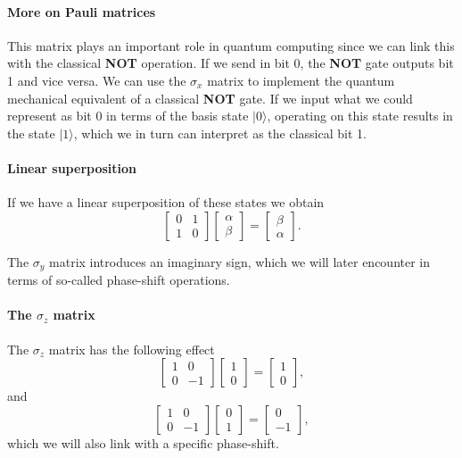 \paragraph{More on Pauli matrices}

This matrix plays an important role in quantum computing since we can
link this with the classical \textbf{NOT} operation.  If we send in bit 0,
the \textbf{NOT} gate outputs bit 1 and vice versa. We can use the $\sigma_x$
matrix to implement the quantum mechanical equivalent of a classical
\textbf{NOT} gate. If we input what we could represent as bit 0 in terms of
the basis state $\vert 0\rangle$, operating on this state results in
the state $\vert 1\rangle$, which we in turn can interpret as the
classical bit 1.


\paragraph{Linear superposition}
If we have a linear superposition of these states we obtain
\[
\begin{bmatrix}0 & 1 \\ 1 & 0 \end{bmatrix}\begin{bmatrix}\alpha \\ \beta \end{bmatrix}=\begin{bmatrix}\beta \\ \alpha \end{bmatrix}.
\]

The $\sigma_y$ matrix introduces an imaginary sign, which we will later encounter in terms of so-called phase-shift operations.


\paragraph{The $\sigma_z$ matrix}
The $\sigma_z$ matrix has the following effect
\[
\begin{bmatrix} 1 & 0 \\ 0 & -1 \end{bmatrix}\begin{bmatrix} 1 \\ 0 \end{bmatrix}=\begin{bmatrix} 1  \\ 0  \end{bmatrix},
\]
and 
\[
\begin{bmatrix} 1 & 0 \\ 0 & -1 \end{bmatrix}\begin{bmatrix} 0 \\ 1 \end{bmatrix}=\begin{bmatrix} 0  \\ -1  \end{bmatrix},
\]
which we will also link with a specific phase-shift.



